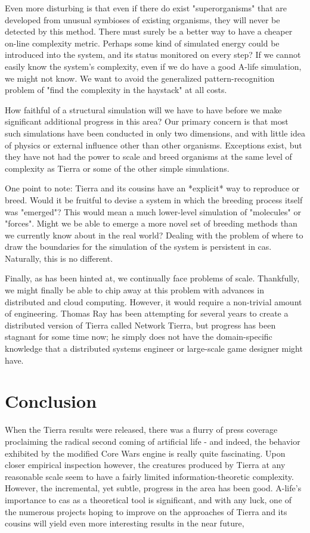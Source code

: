 \documentclass[11pt, twocolumn]{article}
\begin{document}
Even more disturbing is that even if there do exist "superorganisms" that are developed from unusual symbioses of existing organisms, they will never be detected by this method. There must surely be a better way to have a cheaper on-line complexity metric. Perhaps some kind of simulated energy could be introduced into the system, and its status monitored on every step? If we cannot easily know the system's complexity, even if we do have a good A-life simulation, we might not know. We want to avoid the generalized pattern-recognition problem of "find the complexity in the haystack" at all costs.

How faithful of a structural simulation will we have to have before we make significant additional progress in this area? Our primary concern is that most such simulations have been conducted in only two dimensions, and with little idea of physics or external influence other than other organisms. Exceptions exist, but they have not had the power to scale and breed organisms at the same level of complexity as Tierra or some of the other simple simulations.

One point to note: Tierra and its cousins have an *explicit* way to reproduce or breed. Would it be fruitful to devise a system in which the breeding process itself was "emerged"? This would mean a much lower-level simulation of "molecules" or "forces". Might we be able to emerge a more novel set of breeding methods than we currently know about in the real world? Dealing with the problem of where to draw the boundaries for the simulation of the system is persistent in cas. Naturally, this is no different.

Finally, as has been hinted at, we continually face problems of scale. Thankfully, we might finally be able to chip away at this problem with advances in distributed and cloud computing. However, it would require a non-trivial amount of engineering. Thomas Ray has been attempting for several years to create a distributed version of Tierra called Network Tierra, but progress has been stagnant for some time now; he simply does not have the domain-specific knowledge that a distributed systems engineer or large-scale game designer might have.

\section{Conclusion}
When the Tierra results were released, there was a flurry of press coverage proclaiming the radical second coming of artificial life - and indeed, the behavior exhibited by the modified Core Wars engine is really quite fascinating. Upon closer empirical inspection however, the creatures produced by Tierra at any reasonable scale seem to have a fairly limited information-theoretic complexity. However, the incremental, yet subtle, progress in the area has been good. A-life's importance to cas as a theoretical tool is significant, and with any luck, one of the numerous projects hoping to improve on the approaches of Tierra and its cousins will yield even more interesting results in the near future,


\end{document}
